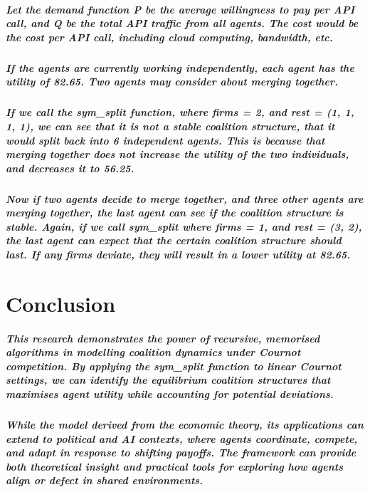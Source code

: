\documentclass[11pt]{report}
\begin{document}
\paragraph{Let the demand function P be the average willingness to pay per API call, and Q be the total API traffic from all agents. The cost would be the cost per API call, including cloud computing, bandwidth, etc.}

\paragraph{If the agents are currently working independently, each agent has the utility of 82.65. Two agents may consider about merging together. }

\paragraph{If we call the sym\_split function, where firms = 2, and rest = (1, 1, 1, 1), we can see that it is not a stable coalition structure, that it would split back into 6 independent agents. This is because that merging together does not increase the utility of the two individuals, and decreases it to 56.25.}

\paragraph{Now if two agents decide to merge together, and three other agents are merging together, the last agent can see if the coalition structure is stable. Again, if we call sym\_split where firms = 1, and rest = (3, 2), the last agent can expect that the certain coalition structure should last. If any firms deviate, they will result in a lower utility at 82.65. }


\chapter{Conclusion}
\paragraph{This research demonstrates the power of recursive, memorised algorithms in modelling coalition dynamics under Cournot competition. By applying the sym\_split function to linear Cournot settings, we can identify the equilibrium coalition structures that maximises agent utility while accounting for potential deviations. }
\paragraph{While the model derived from the economic theory, its applications can extend to political and AI contexts, where agents coordinate, compete, and adapt in response to shifting payoffs. The framework can provide both theoretical insight and practical tools for exploring how agents align or defect in shared environments.  }
\end{document}
